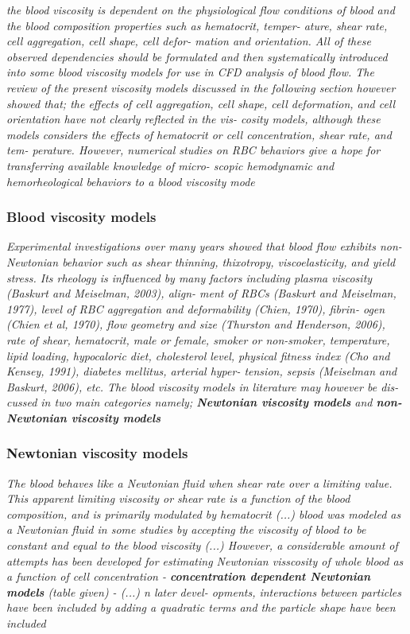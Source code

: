 \documentclass[11pt,letterpaper]{article}
\begin{document}
\textit{the  blood  viscosity  is  dependent on 
the physiological flow conditions of  blood and the
blood composition  properties  such as hematocrit, temper- ature, shear rate,  cell aggregation,  cell shape, cell defor- mation and orientation. All of  these observed dependencies should be formulated  and  then systematically introduced into some  blood viscosity models for use in CFD analysis of blood flow. The review of the present viscosity models discussed in the following section however showed that; the  effects of  cell aggregation, cell shape,  cell deformation, and cell orientation have not  clearly reflected in the vis- cosity  models, although these  models considers  the effects of  hematocrit  or cell concentration, shear rate, and tem- perature.  However, numerical studies on  RBC behaviors give a  hope for  transferring available  knowledge of micro- scopic hemodynamic and hemorheological behaviors to a blood viscosity mode}

\subsubsection*{Blood viscosity  models}
\textit{Experimental investigations over many years showed that blood flow exhibits non-Newtonian behavior such  as shear thinning, thixotropy, viscoelasticity, and yield stress. Its  rheology is influenced by many factors  including plasma viscosity (Baskurt and Meiselman, 2003),  align- ment of  RBCs  (Baskurt  and Meiselman, 1977), level of RBC aggregation and deformability (Chien,  1970),  fibrin- ogen (Chien  et al, 1970), flow  geometry and size (Thurston and Henderson, 2006), rate of shear, hematocrit, male  or female, smoker  or non-smoker, temperature,  lipid loading, hypocaloric diet, cholesterol  level,  physical fitness  index (Cho  and Kensey, 1991), diabetes mellitus, arterial hyper- tension, sepsis (Meiselman and  Baskurt, 2006),  etc. The blood  viscosity  models in literature may however be dis- cussed in two main categories namely;\newline
\textbf{Newtonian viscosity models} and \textbf{non-Newtonian viscosity models}}


\subsubsection*{Newtonian viscosity models}\textit{The  blood behaves like a Newtonian  fluid when shear
rate over a limiting value. This apparent  limiting viscosity or shear rate is a function of  the blood  composition, and  is primarily modulated by hematocrit (...)  blood was modeled as a Newtonian fluid in some studies by accepting the viscosity of blood to be constant and equal to the blood viscosity (...) However, a considerable 
amount  of attempts has been developed for estimating Newtonian visscosity of whole blood as a  function of cell concentration - \textbf{concentration dependent
Newtonian models} (table given) - (...) n later devel- opments, interactions  between  particles have been  included by  adding a quadratic terms and the particle shape have been included}
\end{document}
